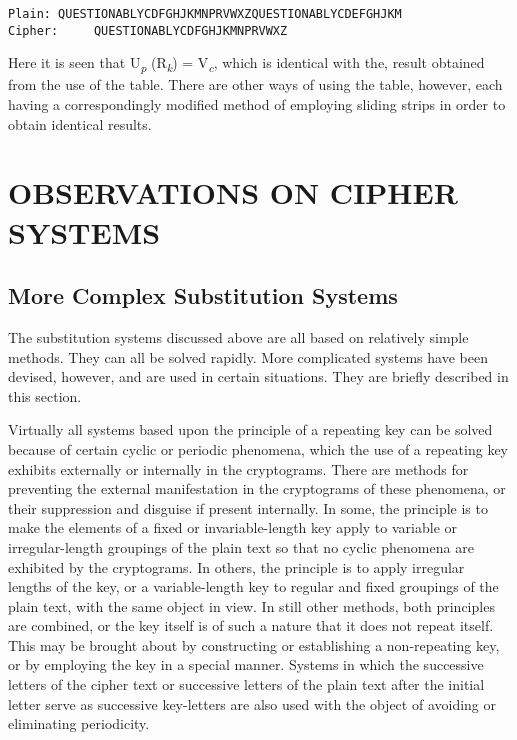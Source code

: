 \begin{verbatim}
Plain: QUESTIONABLYCDFGHJKMNPRVWXZQUESTIONABLYCDEFGHJKM
Cipher:     QUESTIONABLYCDFGHJKMNPRVWXZ
\end{verbatim}

Here it is seen that U\textsubscript{\textit{p}} (R\textsubscript{\textit{k}}) = V\textsubscript{\textit{c}}, which is identical with the, result
obtained from the use of the table. There are other ways of using the
table, however, each having a correspondingly modiﬁed method of employing sliding strips in order to obtain identical results.

\section{OBSERVATIONS ON CIPHER SYSTEMS}

\subsection{More Complex Substitution Systems}

\mypara The substitution systems discussed above are all based on relatively
simple methods. They can all be solved rapidly. More complicated systems have been devised, however, and are used in certain situations.
They are brieﬂy described in this section.

\mypara Virtually all systems based upon the principle of a repeating key
can be solved because of certain cyclic or periodic phenomena, which the
use of a repeating key exhibits externally or internally in the cryptograms. There are methods for preventing the external manifestation in
the cryptograms of these phenomena, or their suppression and disguise
if present internally. In some, the principle is to make the elements of a
ﬁxed or invariable-length key apply to variable or irregular-length groupings of the plain text so that no cyclic phenomena are exhibited by the
cryptograms. In others, the principle is to apply irregular lengths of the
key, or a variable-length key to regular and ﬁxed groupings of the plain
text, with the same object in view. In still other methods, both principles
are combined, or the key itself is of such a nature that it does not repeat
itself. This may be brought about by constructing or establishing a non-repeating key, or by employing the key in a special manner. Systems in
which the successive letters of the cipher text or successive letters of the
plain text after the initial letter serve as successive key-letters are also
used with the object of avoiding or eliminating periodicity.

